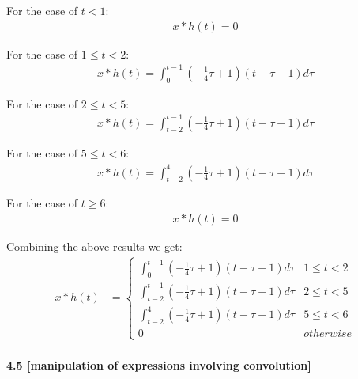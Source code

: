 \documentclass{article}
\begin{document}
For the case of $t < 1$:
\begin{equation*}
\begin{split}
    x * h(t) = 0
\end{split}
\end{equation*}

For the case of $1 \leq t < 2$:
\begin{equation*}
\begin{split}
    x * h(t) = \int_{0}^{t - 1}(-\frac{1}{4}\tau + 1)(t - \tau - 1)d\tau
\end{split}
\end{equation*}

For the case of $2 \leq t < 5$:
\begin{equation*}
\begin{split}
    x * h(t) = \int_{t - 2}^{t - 1}(-\frac{1}{4}\tau + 1)(t - \tau - 1)d\tau
\end{split}
\end{equation*}

For the case of $5 \leq t < 6$:
\begin{equation*}
\begin{split}
    x * h(t) = \int_{t - 2}^{4}(-\frac{1}{4}\tau + 1)(t - \tau - 1)d\tau
\end{split}
\end{equation*}

For the case of $t \geq 6$:
\begin{equation*}
\begin{split}
    x * h(t) = 0
\end{split}
\end{equation*}

Combining the above results we get:
\begin{equation*}
\begin{split}
    x * h(t)
    &= \begin{cases}
        \int_{0}^{t - 1}(-\frac{1}{4}\tau + 1)(t - \tau - 1)d\tau & 1 \leq t < 2\\
        \int_{t - 2}^{t - 1}(-\frac{1}{4}\tau + 1)(t - \tau - 1)d\tau & 2 \leq t < 5\\
        \int_{t - 2}^{4}(-\frac{1}{4}\tau + 1)(t - \tau - 1)d\tau & 5 \leq t < 6\\
        0 & otherwise
    \end{cases}\\
\end{split}
\end{equation*}


\bigskip
{\bf 4.5 [manipulation of expressions involving convolution]}\\
\end{document}
